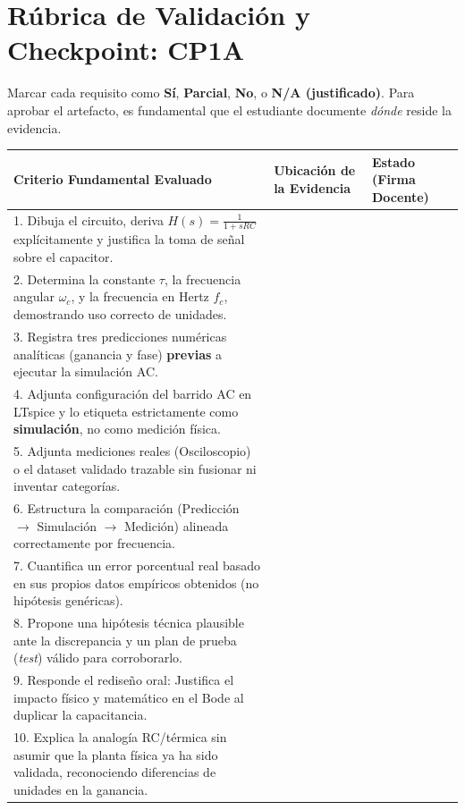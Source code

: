 \documentclass[11pt, a4paper]{article}
\begin{document}
\section*{Rúbrica de Validación y Checkpoint: CP1A}
Marcar cada requisito como \textbf{Sí}, \textbf{Parcial}, \textbf{No}, o \textbf{N/A (justificado)}. Para aprobar el artefacto, es fundamental que el estudiante documente \textit{dónde} reside la evidencia.

\vspace{0.5cm}
\noindent
\begin{tabularx}{\textwidth}{@{} X p{2.5cm} p{2cm} @{}}
\toprule
\textbf{Criterio Fundamental Evaluado} & \textbf{Ubicación de la Evidencia} & \textbf{Estado (Firma Docente)} \\ 
\midrule
1. Dibuja el circuito, deriva $H(s)=\frac{1}{1+sRC}$ explícitamente y justifica la toma de señal sobre el capacitor. & & \\ \addlinespace[10pt]

2. Determina la constante $\tau$, la frecuencia angular $\omega_c$, y la frecuencia en Hertz $f_c$, demostrando uso correcto de unidades. & & \\ \addlinespace[10pt]

3. Registra tres predicciones numéricas analíticas (ganancia y fase) \textbf{previas} a ejecutar la simulación AC. & & \\ \addlinespace[10pt]

4. Adjunta configuración del barrido AC en LTspice y lo etiqueta estrictamente como \textbf{simulación}, no como medición física. & & \\ \addlinespace[10pt]

5. Adjunta mediciones reales (Osciloscopio) o el dataset validado trazable sin fusionar ni inventar categorías. & & \\ \addlinespace[10pt]

6. Estructura la comparación (Predicción $\to$ Simulación $\to$ Medición) alineada correctamente por frecuencia. & & \\ \addlinespace[10pt]

7. Cuantifica un error porcentual real basado en sus propios datos empíricos obtenidos (no hipótesis genéricas). & & \\ \addlinespace[10pt]

8. Propone una hipótesis técnica plausible ante la discrepancia y un plan de prueba (\textit{test}) válido para corroborarlo. & & \\ \addlinespace[10pt]

9. Responde el rediseño oral: Justifica el impacto físico y matemático en el Bode al duplicar la capacitancia. & & \\ \addlinespace[10pt]

10. Explica la analogía RC/térmica sin asumir que la planta física ya ha sido validada, reconociendo diferencias de unidades en la ganancia. & & \\ 
\bottomrule
\end{tabularx}
\end{document}
